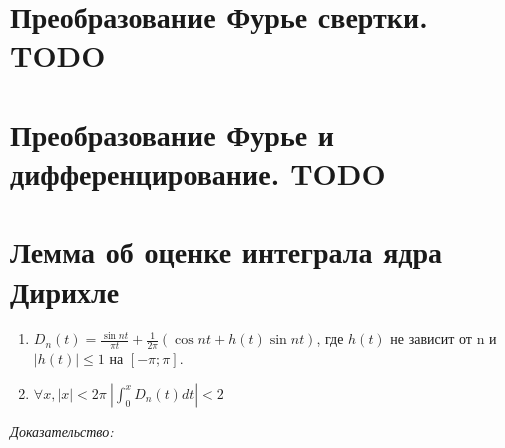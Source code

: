 \documentclass[paper=a4, fontsize=17pt]{article}
\begin{document}
\section{Преобразование Фурье свертки. TODO}
\section{Преобразование Фурье и дифференцирование. TODO}


\section{Лемма об оценке интеграла ядра Дирихле}
\begin{enumerate}
    \item $D_n(t) = \frac{\sin nt}{\pi t} + \frac{1}{2\pi}(\cos nt + h(t)\sin nt)$, где $h(t)$ не зависит от n и $|h(t)| \leq 1$
        на $[-\pi;\pi]$.
    \item $\forall x, |x| < 2\pi\ |\int_0^x D_n(t) dt| < 2$
\end{enumerate}

\emph{Доказательство:}
\end{document}
